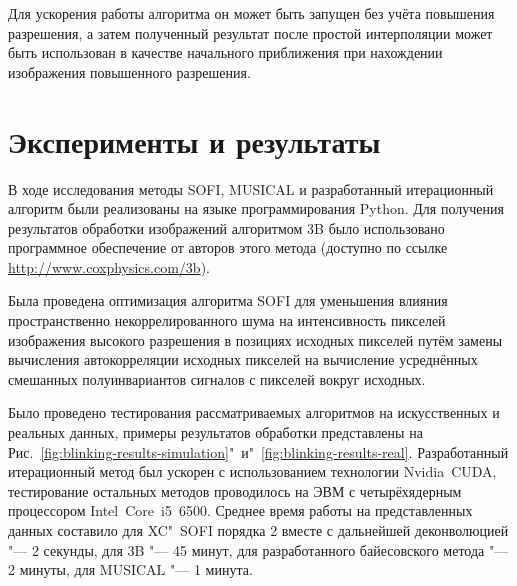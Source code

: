 Для ускорения работы алгоритма он может быть запущен без учёта повышения разрешения, а затем полученный результат после простой интерполяции может быть использован в качестве начального приближения при нахождении изображения повышенного разрешения.

\section{Эксперименты и результаты}

В ходе исследования методы SOFI, MUSICAL и разработанный итерационный алгоритм были реализованы на языке программирования Python. Для получения результатов обработки изображений алгоритмом 3B было использовано программное обеспечение от авторов этого метода (доступно по ссылке \url{http://www.coxphysics.com/3b}).

Была проведена оптимизация алгоритма SOFI для уменьшения влияния пространственно некоррелированного шума на интенсивность пикселей изображения высокого разрешения в позициях исходных пикселей путём замены вычисления автокорреляции исходных пикселей на вычисление усреднённых смешанных полуинвариантов сигналов с пикселей вокруг исходных.

Было проведено тестирования рассматриваемых алгоритмов на искусственных и реальных данных, примеры результатов обработки представлены на Рис.~\ref{fig:blinking-results-simulation}"~и"~\ref{fig:blinking-results-real}. Разработанный итерационный метод был ускорен с использованием технологии Nvidia~CUDA, тестирование остальных методов проводилось на ЭВМ с четырёхядерным процессором Intel~Core~i5~6500. Среднее время работы на представленных данных составило для XC"~SOFI порядка 2 вместе с дальнейшей деконволюцией "--- 2 секунды, для 3B "--- 45 минут, для разработанного байесовского метода "--- 2 минуты, для MUSICAL "--- 1 минута. %

